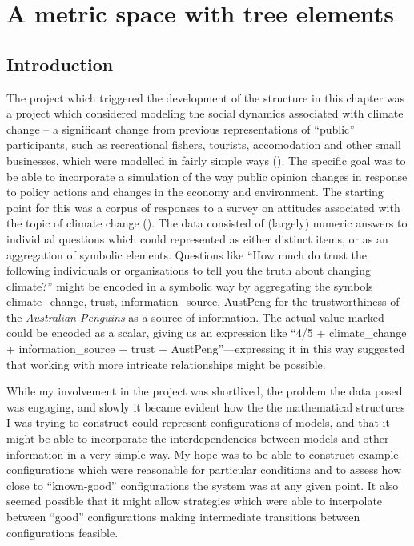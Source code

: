 \chapter[A METRIC SPACE WITH TREE ELEMENTS] {A metric space with tree elements}\label{treering}
\WeAreOn{\cfour}
\section{Introduction}
The project which triggered the development of the structure in this
chapter was a project which considered modeling the social dynamics
associated with climate change -- a significant change from previous
representations of ``public'' participants, such as recreational
fishers, tourists, accomodation and other small businesses, which were
modelled in fairly simple ways (\cite{Fulton2011ningaloo,Gray2014}).
The specific goal was to be able to incorporate a simulation of the
way public opinion changes in response to policy actions and changes
in the economy and environment.  The starting point for this was a
corpus of responses to a survey on attitudes associated with the topic
of climate change (\cite{boschetti2012}). The data consisted of
(largely) numeric answers to individual questions which could
represented as either distinct items, or as an aggregation of symbolic
elements.  Questions like ``How much do trust the following
individuals or organisations to tell you the truth about changing
climate?'' might be encoded in a symbolic way by aggregating the
symbols \textsf{climate\_change, trust, information\_source, AustPeng}
for the trustworthiness of the \emph{Australian Penguins} as a source
of information. The actual value marked could be encoded as a scalar,
giving us an expression like ``\textsf{4/5 + climate\_change +
  information\_source + trust + AustPeng}''---expressing it in this way
suggested that working with more intricate relationships might be
possible.

While my involvement in the project was shortlived, the problem the
data posed was engaging, and slowly it became evident how the the
mathematical structures I was trying to construct could represent
configurations of models, and that it might be able to incorporate
the interdependencies between models and other information in a very
simple way.  My hope was to be able to construct example
configurations which were reasonable for particular conditions and to
assess how close to ``known-good'' configurations the system was
at any given point.  It also seemed possible that it might allow
strategies which were able to interpolate between ``good'' 
configurations making intermediate transitions between configurations
feasible.

